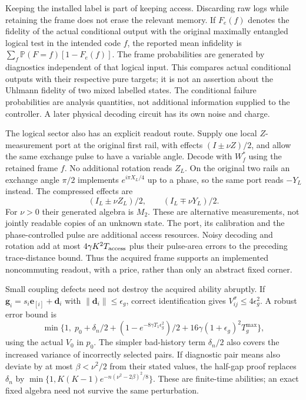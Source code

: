 \documentclass[11pt]{article}
\theoremstyle{definition}
\theoremstyle{remark}
\newcommand{\Prb}{\mathbb P}
\begin{document}
Keeping the installed label is part of keeping access. Discarding raw logs
while retaining the frame does not erase the relevant memory. If
$F_e(f)$ denotes the fidelity of the actual conditional output with the
original maximally entangled logical test in the intended code $f$,
the reported mean infidelity is
$\sum_f\Prb(F=f)[1-F_e(f)]$. The frame probabilities are generated by
diagnostics independent of that logical input. This compares actual
conditional outputs with their respective pure targets; it is not an
assertion about the Uhlmann fidelity of two mixed labelled states.
The conditional failure probabilities are analysis quantities, not
additional information supplied to the controller. A later physical
decoding circuit has its own noise and charge.

The logical sector also has an explicit readout route. Supply one local
$Z$-measurement port at the original first rail, with effects
$(I\pm\nu Z)/2$, and allow the same exchange pulse to have a variable angle.
Decode with $W_f^*$ using the retained frame $f$. No additional rotation
reads $Z_L$. On the original two rails an exchange angle $\pi/2$ implements
$e^{i\pi X_L/4}$ up to a phase, so the same port reads $-Y_L$ instead.
The compressed effects are
\[
 (I_L\pm\nu Z_L)/2,\qquad (I_L\mp\nu Y_L)/2.
\]
For $\nu>0$ their generated algebra is $M_2$. These are alternative
measurements, not jointly readable copies of an unknown state. The port,
its calibration and the phase-controlled pulse are additional access
resources. Noisy decoding and rotation add at most $4\gamma K^2T_{\rm access}$
plus their pulse-area errors to the preceding trace-distance bound.
Thus the acquired frame supports an implemented noncommuting readout,
with a price, rather than only an abstract fixed corner.

Small coupling defects need not destroy the acquired ability abruptly.
If $\boldsymbol g_i=s_i\boldsymbol e_{[i]}+\boldsymbol d_i$ with
$\|\boldsymbol d_i\|\le\epsilon_g$, correct identification gives
$V_{ij}^\sigma\le4\epsilon_g^2$. A robust error bound is
\[
 \min\{1,\;p_0+\delta_n/2+
 (1-e^{-8\gamma T_1\epsilon_g^2})/2+
 16\gamma(1+\epsilon_g)^2T_g^{\max}\},
\]
using the actual $V_0$ in $p_0$. The simpler bad-history term $\delta_n/2$
also covers the increased variance of incorrectly selected pairs.
If diagnostic pair means also deviate by at most $\beta<\nu^2/2$ from
their stated values, the half-gap proof replaces $\delta_n$ by
$\min\{1,K(K-1)e^{-n(\nu^2-2\beta)^2/8}\}$.
These are finite-time abilities; an exact fixed algebra need not survive
the same perturbation.
\end{document}
